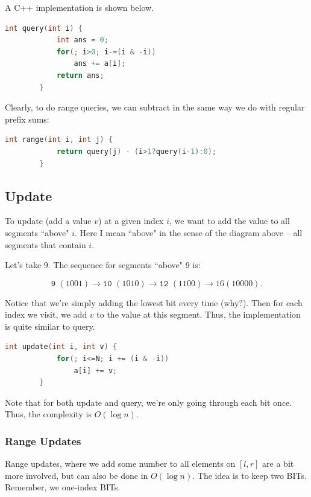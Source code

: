 \documentclass{article}
\begin{document}
        
        A C++ implementation is shown below.
        \begin{lstlisting}[language=C++]
        int query(int i) {
            int ans = 0;
            for(; i>0; i-=(i & -i))
                ans += a[i];
            return ans;
        }
        \end{lstlisting}
        
        Clearly, to do range queries, we can subtract in the same way we do with regular prefix sums:
        
        \begin{lstlisting}[language=C++]
        int range(int i, int j) {
            return query(j) - (i>1?query(i-1):0);
        }
        \end{lstlisting}
    \subsection{Update}
        To update (add a value $v$) at a given index $i$, we want to add the value to all segments ``above" $i$. Here I mean ``above" in the sense of the diagram above -- all segments that contain $i$.
        
        Let's take $9$. The sequence for segments ``above" 9 is:
        
            $$ \texttt{9 }(1001)\rightarrow \texttt{10 }(1010) \rightarrow \texttt{12 }(1100) \rightarrow{16} (10000). $$
            
        Notice that we're simply adding the lowest bit every time (why?). Then for each index we visit, we add $v$ to the value at this segment. Thus, the implementation is quite similar to query. 
        \begin{lstlisting}[language=C++]
        int update(int i, int v) {
            for(; i<=N; i += (i & -i))
                a[i] += v;
        }
        \end{lstlisting}
        
    Note that for both update and query, we're only going through each bit once. Thus, the complexity is $O(\log n)$.
    
        \subsubsection{Range Updates}
            Range updates, where we add some number to all elements on $[l,r]$ are a bit more involved, but can also be done in $O(\log n)$. The idea is to keep two BITs. Remember, we one-index BITs.
            
\end{document}
